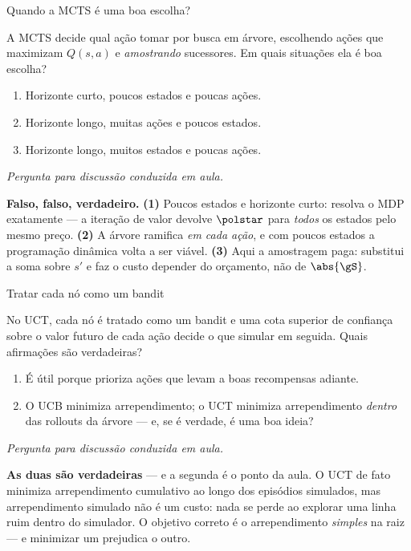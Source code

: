 \documentclass[aspectratio=169, 10pt]{beamer}
\newcommand{\paradiscussao}{\smallskip
  {\footnotesize\color{rlCinza}\itshape Pergunta para discussão conduzida em aula.}}
\begin{document}
\begin{frame}{Quando a MCTS é uma boa escolha?}
  \footnotesize
  \begin{quizbox}{}
    A MCTS decide qual ação tomar por busca em árvore, escolhendo ações que
    maximizam $Q(s,a)$ e \emph{amostrando} sucessores. Em quais situações ela é
    boa escolha?
    \smallskip
    \begin{enumerate}\setlength{\itemsep}{0em}
      \item Horizonte curto, poucos estados e poucas ações.
      \item Horizonte longo, \alert{muitas ações} e poucos estados.
      \item Horizonte longo, \alert{muitos estados} e poucas ações.
    \end{enumerate}
    \paradiscussao
  \end{quizbox}

  \pause
  \vspace{-0.35em}
  \begin{respbox}
    \textbf{Falso, falso, verdadeiro.}
    \textbf{(1)} Poucos estados e horizonte curto: resolva o MDP exatamente — a
    iteração de valor devolve $\polstar$ para \emph{todos} os estados pelo mesmo
    preço.
    \textbf{(2)} A árvore ramifica \emph{em cada ação}, e com poucos estados a
    programação dinâmica volta a ser viável.
    \textbf{(3)} Aqui a amostragem paga: substitui a soma sobre $s'$ e faz o custo
    depender do orçamento, não de $\abs{\gS}$.
  \end{respbox}
\end{frame}

\begin{frame}{Tratar cada nó como um bandit}
  \footnotesize
  \begin{quizbox}{}
    No UCT, cada nó é tratado como um bandit e uma cota superior de confiança
    sobre o valor futuro de cada ação decide o que simular em seguida. Quais
    afirmações são verdadeiras?
    \smallskip
    \begin{enumerate}\setlength{\itemsep}{0em}
      \item É útil porque prioriza ações que levam a boas recompensas adiante.
      \item O UCB minimiza arrependimento; o UCT minimiza arrependimento
            \emph{dentro} das rollouts da árvore --- e, se é verdade, é uma boa
            ideia?
    \end{enumerate}
    \paradiscussao
  \end{quizbox}

  \pause
  \begin{respbox}
    \textbf{As duas são verdadeiras} — e a segunda é o ponto da aula. O UCT de
    fato minimiza arrependimento cumulativo ao longo dos episódios simulados, mas
    arrependimento simulado \alert{não é um custo}: nada se perde ao explorar uma
    linha ruim dentro do simulador. O objetivo correto é o arrependimento
    \emph{simples} na raiz — e minimizar um prejudica o outro.
  \end{respbox}
\end{frame}
\end{document}
